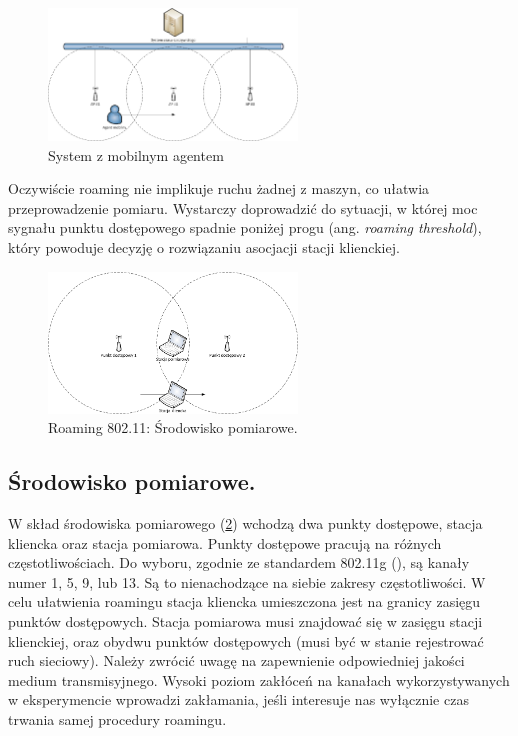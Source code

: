 \begin{figure}[htb]
\begin{center}
\includegraphics[width=250px]{img/System_czasu_rzeczywistego}
\caption{System z mobilnym agentem}
\label{MobileAgentSystem}
\end{center}
\end{figure}

Oczywiście roaming nie implikuje ruchu żadnej z maszyn, co ułatwia przeprowadzenie pomiaru. Wystarczy doprowadzić do sytuacji, w której moc sygnału punktu dostępowego spadnie poniżej progu (ang. \emph{roaming threshold}), który powoduje decyzję o rozwiązaniu asocjacji stacji klienckiej. 

\begin{figure}[htb]
\begin{center}
\includegraphics[width=250px]{img/Roaming}
\caption{Roaming 802.11: Środowisko pomiarowe.}
\label{RoamingEnviroment}
\end{center}
\end{figure}

\subsection{Środowisko pomiarowe.}
\label{sec:MeasurementEnviroment}

W skład środowiska pomiarowego (\ref{RoamingEnviroment}) wchodzą dwa punkty dostępowe, stacja kliencka oraz stacja pomiarowa. Punkty dostępowe pracują na różnych częstotliwościach. Do wyboru, zgodnie ze standardem 802.11g (\cite{std:IEEE80211}), są kanały numer 1, 5, 9, lub 13. Są to nienachodzące na siebie zakresy częstotliwości. W celu ułatwienia roamingu stacja kliencka umieszczona jest na granicy zasięgu punktów dostępowych. Stacja pomiarowa musi znajdować się w zasięgu stacji klienckiej, oraz obydwu punktów dostępowych (musi być w stanie rejestrować ruch sieciowy). 
Należy zwrócić uwagę na zapewnienie odpowiedniej jakości medium transmisyjnego. Wysoki poziom zakłóceń na kanałach wykorzystywanych w eksperymencie wprowadzi zakłamania, jeśli interesuje nas wyłącznie czas trwania samej procedury roamingu. 

